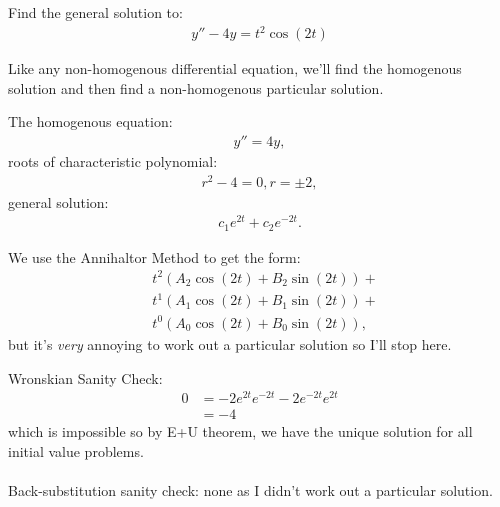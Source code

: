 \documentclass[11pt]{article}
\begin{document}
    \newpage \setcounter{equation}{-1}
    \newpage \setcounter{equation}{-1} \begin{problem} 
        Find the general solution to:
        \begin{align}
            y'' - 4y = t^2\cos(2t)
        \end{align}
    \end{problem}
        \begin{remark}[Method.]
            Like any non-homogenous differential equation, we'll find the homogenous solution and then find a non-homogenous particular solution.
        \end{remark}
        \begin{solution}[Solution 2ai]
            The homogenous equation:
            \begin{align}
                y'' = 4y,
            \end{align}
            roots of characteristic polynomial:
            \begin{align}
                r^2-4 = 0, r = \pm 2,
            \end{align}
            general solution:
            \begin{align}
                c_1e^{2t} + c_2e^{-2t}.
            \end{align}
        \end{solution}
        \begin{solution}
            We use the Annihaltor Method to get the form:
            \begin{align}
                &t^2(A_2\cos(2t) + B_2\sin(2t)) + \\
                &t^1(A_1\cos(2t) + B_1\sin(2t)) + \\
                &t^0(A_0\cos(2t) + B_0\sin(2t)),
            \end{align}
            but it's \textit{very} annoying to work out a particular solution so I'll stop here.
        \end{solution}
        \begin{remark}[Footnotes.]
            Wronskian Sanity Check:
            \begin{align}
                0 &= -2e^{2t}e^{-2t} - 2e^{-2t}e^{2t} \\
                &= -4
            \end{align}
            which is impossible so by E+U theorem, we have the unique solution for all initial value problems. \\~\\
            Back-substitution sanity check: none as I didn't work out a particular solution.
        \end{remark}
\end{document}
